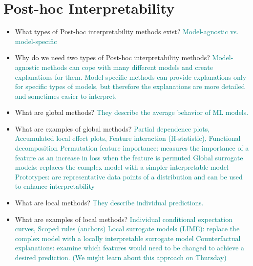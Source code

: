 \documentclass{report}
\newcommand{\asw}[2][teal]{}
\renewcommand{\asw}[2][teal]{\textcolor{#1}{#2}}
\begin{document}
	\newpage

	\section{Post-hoc Interpretability}
	
	\begin{itemize}
	\item What types of Post-hoc interpretability methods exist?
	\asw{\newline Model-agnostic vs. model-specific}
	\item Why do we need two types of Post-hoc interpretability methods?
	\asw{\newline Model-agnostic methods can cope with many different models and create explanations for them. Model-specific methods can provide explanations only for specific types of models, but therefore the explanations are more detailed and sometimes easier to interpret.}
	\item What are global methods?
	\asw{\newline They describe the average behavior of ML models.}
	\item What are examples of global methods?
	\asw{\newline Partial dependence plots, Accumulated local effect plots, Feature interaction (H-statistic), Functional decomposition
		\newline Permutation feature importance: measures the importance of a feature as an increase in loss when the feature is permuted
		\newline Global surrogate models: replaces the complex model with a simpler interpretable model
		\newline Prototypes: are representative data points of a distribution and can be used to enhance interpretability}
	\item What are local methods?
	\asw{\newline They describe individual predictions.}
	\item What are examples of local methods?
	\asw{\newline Individual conditional expectation curves, Scoped rules (anchors)
		\newline Local surrogate models (LIME): replace the complex model with a locally interpretable surrogate
		model
		\newline Counterfactual explanations: examine which features would need to be changed to achieve a desired prediction. (We might learn about this approach on Thursday)
}
\end{itemize}
\end{document}
